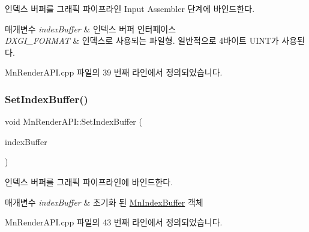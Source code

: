 인덱스 버퍼를 그래픽 파이프라인 Input Assembler 단계에 바인드한다. 


\begin{DoxyParams}{매개변수}
{\em index\+Buffer} & 인덱스 버퍼 인터페이스 \\
\hline
{\em D\+X\+G\+I\+\_\+\+F\+O\+R\+M\+AT} & 인덱스로 사용되는 파일형. 일반적으로 4바이트 U\+I\+N\+T가 사용된다. \\
\hline
\end{DoxyParams}


Mn\+Render\+A\+P\+I.\+cpp 파일의 39 번째 라인에서 정의되었습니다.

\mbox{\label{class_m_n_l_1_1_mn_render_a_p_i_a59cab952055a4c763cefe8be9a213b8b}} 
\subsubsection{\texorpdfstring{Set\+Index\+Buffer()}{SetIndexBuffer()}\hspace{0.1cm}{\footnotesize\ttfamily [2/2]}}
{\footnotesize\ttfamily void Mn\+Render\+A\+P\+I\+::\+Set\+Index\+Buffer (\begin{DoxyParamCaption}\item[{const \hyperlink{class_m_n_l_1_1_mn_index_buffer}{Mn\+Index\+Buffer} \&}]{index\+Buffer }\end{DoxyParamCaption})}



인덱스 버퍼를 그래픽 파이프라인에 바인드한다. 


\begin{DoxyParams}{매개변수}
{\em index\+Buffer} & 초기화 된 \hyperlink{class_m_n_l_1_1_mn_index_buffer}{Mn\+Index\+Buffer} 객체 \\
\hline
\end{DoxyParams}


Mn\+Render\+A\+P\+I.\+cpp 파일의 43 번째 라인에서 정의되었습니다.

\mbox{\label{class_m_n_l_1_1_mn_render_a_p_i_a1c279cbdd724db75c9b46a235a4eefc3}} 

